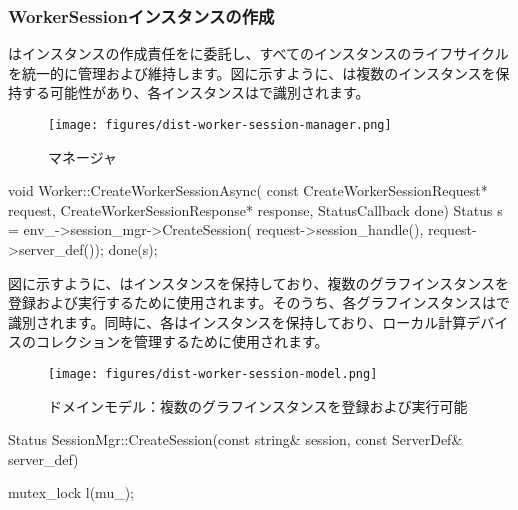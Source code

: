 \begin{content}
\subsubsection{WorkerSessionインスタンスの作成}

はインスタンスの作成責任をに委託し、すべてのインスタンスのライフサイクルを統一的に管理および維持します。図に示すように、は複数のインスタンスを保持する可能性があり、各インスタンスはで識別されます。

\begin{figure}[H]
\centering
\texttt{[image: figures/dist-worker-session-manager.png]}
\caption{マネージャ}
 \label{fig:dist-worker-session-manager}
\end{figure}

\begin{leftbar}
\begin{c++}
void Worker::CreateWorkerSessionAsync(
    const CreateWorkerSessionRequest* request,
    CreateWorkerSessionResponse* response,
    StatusCallback done) {
  Status s = env_->session_mgr->CreateSession(
      request->session_handle(),
      request->server_def());
  done(s);
}
\end{c++}
\end{leftbar}

図に示すように、はインスタンスを保持しており、複数のグラフインスタンスを登録および実行するために使用されます。そのうち、各グラフインスタンスはで識別されます。同時に、各はインスタンスを保持しており、ローカル計算デバイスのコレクションを管理するために使用されます。

\begin{figure}[H]
\centering
\texttt{[image: figures/dist-worker-session-model.png]}
\caption{ドメインモデル：複数のグラフインスタンスを登録および実行可能}
 \label{fig:dist-worker-session-model}
\end{figure}

\begin{leftbar}
\begin{c++}
Status SessionMgr::CreateSession(const string& session,
                                 const ServerDef& server_def) {
  mutex_lock l(mu_);

}
\end{c++}
\end{leftbar}
\end{content}
